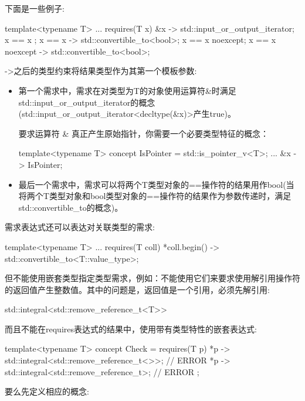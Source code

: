 下面是一些例子:

\begin{cpp}
template<typename T>
... requires(T x) {
	{ &x } -> std::input_or_output_iterator;
	{ x == x };
	{ x == x } -> std::convertible_to<bool>;
	{ x == x }noexcept;
	{ x == x }noexcept -> std::convertible_to<bool>;
}
\end{cpp}

->之后的类型约束将结果类型作为其第一个模板参数:

\begin{itemize}
\item
第一个需求中，需求在对类型为T的对象使用运算符\&时满足std::input\_or\_output\_iterator的概念(std::input\_or\_output\_iterator<decltype(\&x)>产生true)。

要求运算符 & 真正产生原始指针，你需要一个必要类型特征的概念：

\begin{cpp}
template<typename T> concept IsPointer = std::is_pointer_v<T>;
 ...
   { &x } -> IsPointer;
\end{cpp}

\item
最后一个需求中，需求可以将两个T类型对象的==操作符的结果用作bool(当将两个T类型对象和bool类型对象的==操作符的结果作为参数传递时，满足std::convertible\_to的概念)。
\end{itemize}

需求表达式还可以表达对关联类型的需求:

\begin{cpp}
template<typename T>
... requires(T coll) {
	{ *coll.begin() } -> std::convertible_to<T::value_type>;
}
\end{cpp}

但不能使用嵌套类型指定类型需求，例如：不能使用它们来要求使用解引用操作符的返回值产生整数值。其中的问题是，返回值是一个引用，必须先解引用:

\begin{cpp}
std::integral<std::remove_reference_t<T>>
\end{cpp}

而且不能在requires表达式的结果中，使用带有类型特性的嵌套表达式:

\begin{cpp}
template<typename T>
concept Check = requires(T p) {
	{ *p } -> std::integral<std::remove_reference_t<>>; // ERROR
	{ *p } -> std::integral<std::remove_reference_t>; // ERROR
};
\end{cpp}

要么先定义相应的概念:

